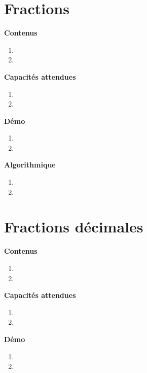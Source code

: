 \documentclass[10pt,a4paper]{article}
\begin{document}
\section{Fractions}

\textbf{Contenus}

\begin{enumerate} 
\item 
\item 
\end{enumerate}


\textbf{Capacités attendues}

\begin{enumerate}
\item 
\item 
\end{enumerate}

\textbf{Démo}

\begin{enumerate}
\item 
\item 
\end{enumerate}

\textbf{Algorithmique}

\begin{enumerate}
\item 
\item 
\end{enumerate}

\section{Fractions décimales}

\textbf{Contenus}

\begin{enumerate} 
\item 
\item 
\end{enumerate}


\textbf{Capacités attendues}

\begin{enumerate}
\item 
\item 
\end{enumerate}

\textbf{Démo}

\begin{enumerate}
\item 
\item 
\end{enumerate}
\end{document}
